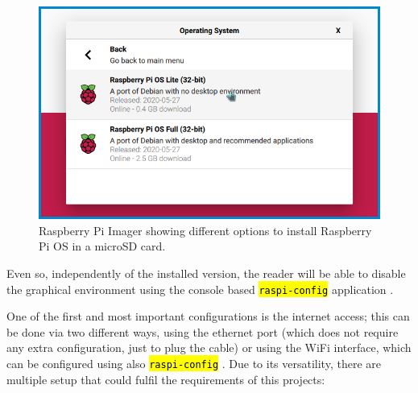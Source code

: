\documentclass[11pt,a4paper,dvipsnames,twoside]{article}
\newcommand{\cmd}[1] {\hl{\texttt{#1}}}
\begin{document}
\begin{figure}[htp]
  \centering
  \includegraphics[width=.9\textwidth]{../pictures/rpi_imager.png}
  \caption{Raspberry Pi Imager showing different options to install Raspberry Pi OS in a microSD card.}
  \label{fig:RpiImager}
\end{figure}

Even so, independently of the installed version, the reader will be able to disable the graphical environment using the console based \cmd{raspi-config} application \cite{RaspiConf}. 

One of the first and most important configurations is the internet access; this can be done via two different ways, using the ethernet port (which does not require any extra configuration, just to plug the cable) or using the WiFi interface, which can be configured using also \cmd{raspi-config} \cite{RaspiWIFIcli}. Due to its versatility, there are multiple setup that could fulfil the requirements of this projects:
\end{document}
